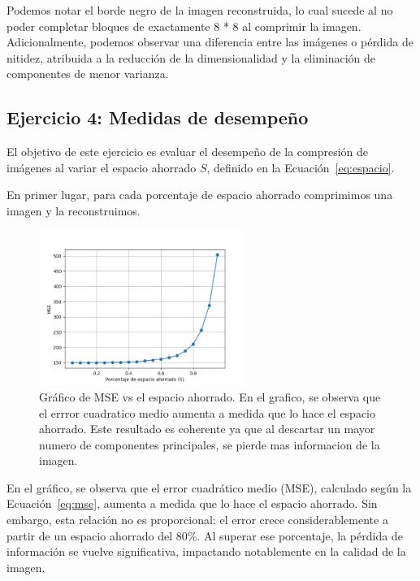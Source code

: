 \documentclass[a4paper,12pt]{article}
\begin{document}
Podemos notar el borde negro de la imagen reconstruida, lo cual sucede al no poder completar bloques de exactamente 8 * 8 al comprimir la imagen.
Adicionalmente, podemos observar una diferencia entre las imágenes o pérdida de nitidez, atribuida a la reducción de la dimensionalidad y la eliminación de componentes de menor varianza.

\vspace{0.5em}

\subsection*{Ejercicio 4: Medidas de desempeño}

El objetivo de este ejercicio es evaluar el desempeño de la compresión de imágenes al variar el espacio ahorrado $S$, definido en la Ecuación~\ref{eq:espacio}.

En primer lugar, para cada porcentaje de espacio ahorrado comprimimos una imagen y la reconstruimos.

\begin{figure}[H]
    \centering
    \includegraphics[width=0.6\textwidth]{Ejercicio 4a.png}
    \caption{Gráfico de MSE vs el espacio ahorrado. En el grafico, se observa que el errror cuadratico medio aumenta a 
    medida que lo hace el espacio ahorrado. Este resultado es coherente ya que al descartar un mayor numero de componentes principales, 
    se pierde mas informacion de la imagen.}
    \label{fig:ej4}
\end{figure}

En el gráfico, se observa que el error cuadrático medio (MSE), calculado según la Ecuación~\ref{eq:mse}, aumenta a medida que lo hace el espacio ahorrado.
Sin embargo, esta relación no es proporcional: el error crece considerablemente a partir de un espacio ahorrado del 80\%. Al superar ese porcentaje, la pérdida de información se vuelve significativa, impactando notablemente en la calidad de la imagen. 
\end{document}
